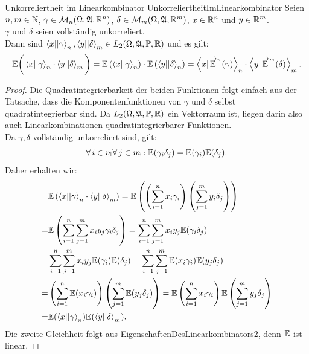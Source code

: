 \begin{lemma}{Unkorreliertheit im Linearkombinator}
             {UnkorreliertheitImLinearkombinator}
Seien $n, m \in \mathbb{N}$, $\gamma\in \mathcal{M}_n(\Omega, \mathfrak{A}, \mathbb{R}^n)$,
$\delta\in\mathcal{M}_m(\Omega, \mathfrak{A}, \mathbb{R}^m)$, $x \in \mathbb{R}^n$ und $y \in \mathbb{R}^m$.\\
$\gamma$ und $\delta$ seien vollständig unkorreliert.\\
Dann sind
$\left\langle x ||\gamma\right\rangle _{n}, \left\langle y ||\delta\right\rangle _m \in L_2(\Omega, \mathfrak{A}, \mathbb{P}, \mathbb{R})$
und es gilt:
\begin{align*}\mathbb{E}\bigg(\left\langle x ||\gamma\right\rangle _{n} \cdot \left\langle y ||\delta\right\rangle _m \bigg)
  = \mathbb{E}\left(\left\langle x ||\gamma\right\rangle_{n}\right)\cdot\mathbb{E}\left(\left\langle y ||\delta\right\rangle_{n} \right)
= \left\langle x |{\overrightarrow{\mathbb{E}}}^{{}_n} (\gamma)\right\rangle _n \cdot \left\langle y |{\overrightarrow{\mathbb{E}}}^{{}_m} (\delta)\right\rangle _m
\text.
\end{align*}
\end{lemma}
\begin{proof}
Die Quadratintegrierbarkeit der beiden Funktionen folgt einfach aus der
Tatsache, dass die Komponentenfunktionen von $\gamma$ und $\delta$ selbst
quadratintegrierbar sind. Da $L_2(\Omega, \mathfrak{A}, \mathbb{P}, \mathbb{R})$ ein Vektorraum ist,
liegen darin also auch Linearkombinationen quadratintegrierbarer Funktionen.\\
Da $\gamma, \delta$ vollständig unkorreliert sind, gilt:
\[\forall\, i \in \haken n\, \forall\, j \in \haken m: \E(\gamma_i\delta_j)
= \E(\gamma_i)\E(\delta_j)\text.\]
Daher erhalten wir:
\begin{align*}
& \mathbb{E}\left(\left\langle x ||\gamma\right\rangle _{n} \cdot \left\langle y ||\delta\right\rangle _m \right)
= \mathbb{E}\left( \left(\sum_{i=1}^n x_i \gamma_i\right) 
           \left(\sum_{j=1}^m y_i \delta_j \right) \right)\\
= & \mathbb{E}\left(\sum_{i=1}^n \sum_{j=1}^m x_iy_j\gamma_i\delta_j \right)
 = \sum_{i=1}^n \sum_{j=1}^m x_iy_j\mathbb{E}(\gamma_i\delta_j)\\
 =& \sum_{i=1}^n \sum_{j=1}^m x_iy_j\mathbb{E}(\gamma_i)\mathbb{E}(\delta_j)
 = \sum_{i=1}^n \sum_{j=1}^m \mathbb{E}(x_i\gamma_i)\mathbb{E}(y_j\delta_j)\\
 =& \left(\sum_{i=1}^n\mathbb{E}(x_i\gamma_i) \right) 
    \left(\sum_{j=1}^m\mathbb{E}(y_j\delta_j) \right)
 = \mathbb{E}\left(\sum_{i=1}^n x_i\gamma_i \right)
   \mathbb{E}\left(\sum_{j=1}^m y_j\delta_j \right)\\
 =& \mathbb{E}(\left\langle x ||\gamma\right\rangle _n) \mathbb{E}(\left\langle y ||\delta\right\rangle _m)\text.
\end{align*}
Die zweite Gleichheit folgt aus 
{EigenschaftenDesLinearkombinators2}, denn $\mathbb{E}$ ist linear.
\end{proof}
